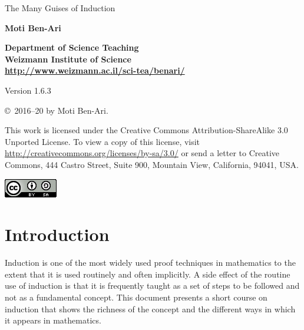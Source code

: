 \documentclass[11pt,a4paper]{report}
\begin{document}
\thispagestyle{empty}

\begin{center}
\begin{Huge}
\begin{bfseries}
The Many Guises of Induction
\end{bfseries}
\end{Huge}

\bigskip
\bigskip
\bigskip

\textbf{\LARGE Moti Ben-Ari}

\bigskip

\textbf{\Large Department of Science Teaching\\
Weizmann Institute of Science\\
\bigskip
\url{http://www.weizmann.ac.il/sci-tea/benari/}
}

\bigskip
\bigskip


\begin{Large}
Version 1.6.3
\end{Large}
\end{center}

\vfill

\begin{center}
\copyright{}\  2016--20 by Moti Ben-Ari.
\end{center}

This work is licensed under the Creative Commons Attribution-ShareAlike 3.0 Unported License. To view a copy of this license, visit \url{http://creativecommons.org/licenses/by-sa/3.0/} or send a letter to Creative Commons, 444 Castro Street, Suite 900, Mountain View, California, 94041, USA.

\begin{center}
\includegraphics[width=.2\textwidth]{../../by-sa.png}
\end{center}

\newpage

\setcounter{tocdepth}{0}
\tableofcontents

\chapter{Introduction}\label{s.intro}

Induction is one of the most widely used proof techniques in mathematics to the extent that it is used routinely and often implicitly. A side effect of the routine use of induction is that it is frequently taught as a set of steps to be followed and not as a fundamental concept. This document presents a short course on induction that shows the richness of the concept and the different ways in which it appears in mathematics.
\end{document}
